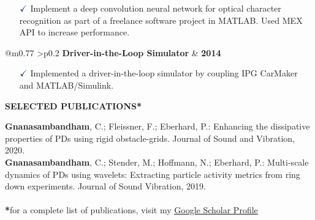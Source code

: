 \documentclass[a4paper,10pt]{article}
\begin{document}
{\small
\begin{itemize}
    \item[$\textcolor{highlightcolor}{\checkmark}$]  
        Implement a deep convolution neural network for optical character recognition as part of a freelance software project in MATLAB. Used MEX API to increase performance. 
\end{itemize}
}

\vspace{0.3cm}
\noindent
\begin{tabular}{ @{\hskip 0pt}m{0.77\textwidth} >{\raggedleft\arraybackslash}p{0.2\textwidth} }
    \noindent\textbf{Driver-in-the-Loop Simulator} & \textbf{2014}
\end{tabular}

{\small
\begin{itemize}
    \item[$\textcolor{highlightcolor}{\checkmark}$]  
    Implemented a driver-in-the-loop simulator by coupling IPG CarMaker and MATLAB/Simulink.
\end{itemize}
}

\noindent{\rule{\linewidth}{1.4pt}}
\textbf{SELECTED PUBLICATIONS*}

\vspace{-0.1cm}
\noindent{\rule{\linewidth}{0.01cm}}

{\small 
    \noindent \textbf{Gnanasambandham}, C.; Fleissner, F.; Eberhard, P.: Enhancing the dissipative properties of PDs using rigid obstacle-grids. Journal of Sound and Vibration, 2020.\\
    \noindent \textbf{Gnanasambandham}, C.; Stender, M.; Hoffmann, N.; Eberhard, P.: Multi-scale dynamics of PDs using wavelets: Extracting particle activity metrics from ring down experiments. Journal of Sound Vibration, 2019.\\ \\
    \noindent \textbf{*}for a complete list of publications, visit my \href{https://scholar.google.com/citations?user=azp3ffYAAAAJ&hl=de}{\textcolor{highlightcolor}{\underline{Google Scholar Profile}}} 
}
\end{document}
